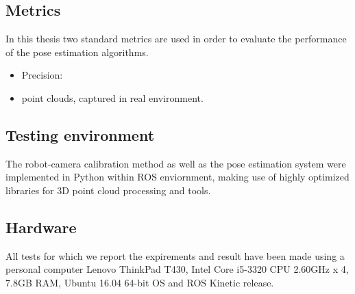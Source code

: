 \subsection{Metrics}
In this thesis two standard metrics are used in order to evaluate the performance of the pose estimation algorithms.
\begin{itemize}
\item Precision:
\item point clouds, captured in real environment. 
\end{itemize}



\subsection{Testing environment}
The robot-camera calibration method as well as the pose estimation system were implemented in Python within ROS enviornment, making use of highly optimized libraries for 3D point cloud processing and tools. 

\subsection{Hardware}
All tests for which we report the expirements and result have been made using a personal computer Lenovo ThinkPad T430, Intel Core i5-3320 CPU 2.60GHz x 4, 7.8GB RAM, Ubuntu 16.04 64-bit OS
and ROS Kinetic release.

\fi